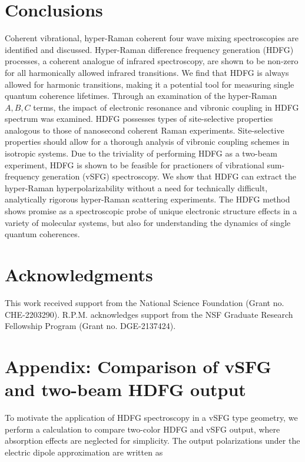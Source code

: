 \documentclass[aip, jcp, reprint, twocolumn]{revtex4-2}
\begin{document}
\section{Conclusions}\label{conclusion}
Coherent vibrational, hyper-Raman coherent four wave mixing spectroscopies are identified and discussed.
Hyper-Raman difference frequency generation (HDFG) processes, a coherent analogue of infrared spectroscopy, are shown to be non-zero for all harmonically allowed infrared transitions.
We find that HDFG is always allowed for harmonic transitions, making it a potential tool for measuring single quantum coherence lifetimes. 
Through an examination of the hyper-Raman $A,B,C$ terms, the impact of electronic resonance and vibronic coupling in HDFG spectrum was examined.
HDFG possesses types of site-selective properties analogous to those of nanosecond coherent Raman experiments. 
Site-selective properties should allow for a thorough analysis of vibronic coupling schemes in isotropic systems.
Due to the triviality of performing HDFG as a two-beam experiment, HDFG is shown to be feasible for practioners of vibrational sum-frequency generation (vSFG) spectroscopy. 
We show that HDFG can extract the hyper-Raman hyperpolarizability without a need for technically difficult, analytically rigorous hyper-Raman scattering experiments. 
The HDFG method shows promise as a spectroscopic probe of unique electronic structure effects in a variety of molecular systems, but also for understanding the dynamics of single quantum coherences. 

\section{Acknowledgments}
This work received support from the National Science Foundation (Grant no. CHE-2203290).
R.P.M. acknowledges support from the NSF Graduate Research Fellowship Program (Grant no. DGE-2137424). 

\section{Appendix: Comparison of vSFG and two-beam HDFG output}\label{appendixA}
 To motivate the application of HDFG spectroscopy in a vSFG type geometry, we perform a calculation to compare two-color HDFG and vSFG output, where absorption effects are neglected for simplicity.
 The output polarizations under the electric dipole approximation are written as
\end{document}
